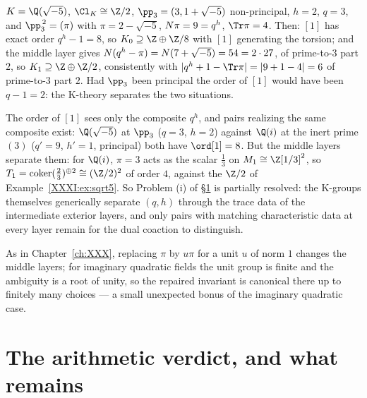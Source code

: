 \begin{example}\label{XXXI:ex:sqrt5}
$K=\Q(\sqrt{-5})$, $\Cl_K\cong\Z/2$, $\pp_3=(3,1+\sqrt{-5})$ non-principal, $h=2$,
$q=3$, and $\pp_3^{\,2}=(\pi)$ with $\pi=2-\sqrt{-5}$, $N\pi=9=q^h$, $\Tr\pi=4$. Then:
$[1]$ has exact order $q^h-1=8$, so $K_0\supseteq\Z\oplus\Z/8$ with $[1]$ generating the
torsion; and the middle layer gives
$N(q^h-\pi)=N(7+\sqrt{-5})=54=2\cdot27$, of prime-to-$3$ part $2$, so
$K_1\supseteq\Z\oplus\Z/2$, consistently with
$|q^h+1-\Tr\pi|=|9+1-4|=6$ of prime-to-$3$ part $2$. Had $\pp_3$ been principal the
order of $[1]$ would have been $q-1=2$: the K-theory separates the two situations.
\end{example}

\begin{remark}\label{XXXI:rem:separate}
The order of $[1]$ sees only the composite $q^h$, and pairs realizing the same composite
exist: $\Q(\sqrt{-5})$ at $\pp_3$ ($q=3$, $h=2$) against $\Q(i)$ at the inert prime
$(3)$ ($q'=9$, $h'=1$, principal) both have $\ord[1]=8$. But the middle layers separate
them: for $\Q(i)$, $\pi=3$ acts as the scalar $\tfrac13$ on $M_1\cong\Z[1/3]^2$, so
$T_1=\operatorname{coker}(\tfrac23)^{\oplus2}\cong(\Z/2)^2$ of order $4$, against the
$\Z/2$ of Example~\ref{XXXI:ex:sqrt5}. So Problem (i) of \S\ref{XXXI:sec:verdict} is partially
resolved: the K-groups themselves generically separate $(q,h)$ through the trace data of
the intermediate exterior layers, and only pairs with matching characteristic data at
every layer remain for the dual coaction to distinguish.
\end{remark}

\begin{remark}\label{XXXI:rem:units}
As in Chapter~\ref{ch:XXX}, replacing $\pi$ by $u\pi$ for a unit $u$ of norm $1$ changes the middle
layers; for imaginary quadratic fields the unit group is finite and the ambiguity is a
root of unity, so the repaired invariant is canonical there up to finitely many choices
--- a small unexpected bonus of the imaginary quadratic case.
\end{remark}

\section{The arithmetic verdict, and what remains}\label{XXXI:sec:verdict}

